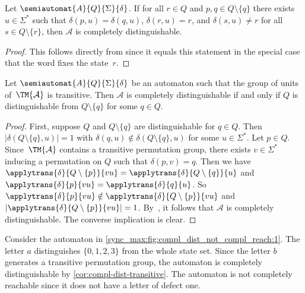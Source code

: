 \begin{corollary}\label{sync_max:cor:sufficient-compl-dist}
	Let $\semiautomat{A}{Q}{\Sigma}{\delta}$.
	If for all $r \in Q$
	and $p, q \in Q \setminus \{q\}$
	there exists $u \in \Sigma^*$
	such that $\delta(p, u) = \delta(q, u)$, $\delta(r, u) = r$,
	and $\delta(s, u) \ne r$ for all $s \in Q \setminus \{r\}$, then $\mathcal A$
	is completely distinguishable.
\end{corollary}
\begin{proof}
	This follows directly from 
	since it equals this statement in the special case that the word fixes the state~$r$.
\end{proof}

\begin{corollary}\label{cor:compl-dist-transitive}
	Let $\semiautomat{A}{Q}{\Sigma}{\delta}$
	be an automaton such that the group of units of~$\TM{\mathcal A}$
	is transitive.
	Then $\mathcal A$ is completely distinguishable
	if and only if $Q$ is distinguishable from $Q \setminus \{q\}$
	for some $q \in Q$.		
\end{corollary}
\begin{proof}
	First, suppose $Q$ and $Q \setminus \{q\}$ are distinguishable for $q \in Q$.
	Then $|\delta(Q \setminus \{q\}, u)| = 1$
	with $\delta(q, u) \notin \delta(Q \setminus\{q\}, u)$
	for some $u \in \Sigma^*$.
	Let $p \in Q$.
	Since~$\TM{\mathcal A}$ contains a transitive permutation group, 
	there exists $v \in \Sigma^*$ inducing a permutation on $Q$
	such that $\delta(p, v) = q$.
	Then we have $\applytrans{\delta}{Q \setminus \{p\}}{vu} = \applytrans{\delta}{Q\setminus\{q\}}{u}$
	and $\applytrans{\delta}{p}{vu} = \applytrans{\delta}{q}{u}$.
	So $\applytrans{\delta}{p}{vu} \notin \applytrans{\delta}{Q \setminus\{p\}}{vu}$
	and $|\applytrans{\delta}{Q\setminus \{p\}}{vu}| = 1$.
	By~,
	it follows that $\mathcal A$ is completely distinguishable.	
	The converse implication is clear.
\end{proof}

\begin{example}  \label{sync_max:ex:compl-dist-non-cr}
	Consider the automaton
	in \cref{sync_max:fig:compl_dist_not_compl_reach:1}.
	The letter $a$ distinguishes $\{0,1,2,3\}$
	from the whole state set. 
	Since the letter $b$ generates a transitive permutation group,
	the automaton is completely distinguishable by \cref{cor:compl-dist-transitive}.	
	The automaton is not completely reachable
	since it does not have a letter of defect one.
\end{example}

